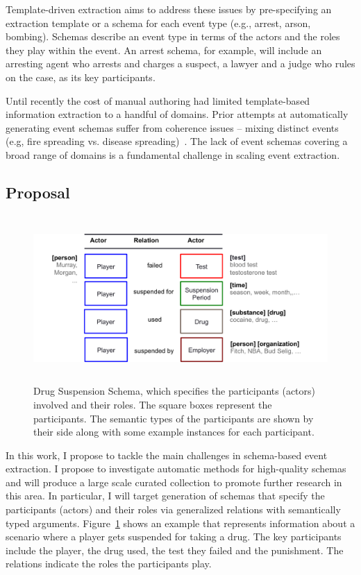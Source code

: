 Template-driven extraction aims to address these issues by pre-specifying an extraction template or a schema for each event type (e.g., arrest, arson, bombing). Schemas describe an event type in terms of the actors and the roles they play within the event. An arrest schema, for example, will include an arresting agent who arrests and charges a suspect, a lawyer and a judge who rules on the case, as its key participants. 

Until recently the cost of manual authoring had limited template-based information extraction to a handful of domains. 
Prior attempts at automatically generating event schemas suffer from coherence issues -- mixing distinct events (e.g, fire spreading vs. disease spreading)~\cite{chambers-acl09}. The lack of event schemas covering a broad range of domains is a fundamental challenge in scaling event extraction. 

\subsection{Proposal}
\begin{figure}[thb]
	\begin{center}
	\includegraphics[width=5.7in,height=2.5in]{figures/drug-schema} 	
	\caption{\label{fig:drug-schema} {Drug Suspension Schema, which specifies the participants (actors) involved and their roles. The square boxes represent the participants. The semantic types of the participants are shown by their side along with some example instances for each participant.}}
	\end{center}
\end{figure}
In this work, I propose to tackle the main challenges in schema-based event extraction. I propose to investigate automatic methods for high-quality schemas and will produce a large scale curated collection to promote further research in this area. In particular, I will target generation of schemas that specify the participants (actors) and their roles via generalized relations with semantically typed arguments. Figure~\ref{fig:drug-schema} shows an example that represents information about a scenario where a player gets suspended for taking a drug. The key participants include the player, the drug used, the test they failed and the punishment. The relations indicate the roles the participants play.  

